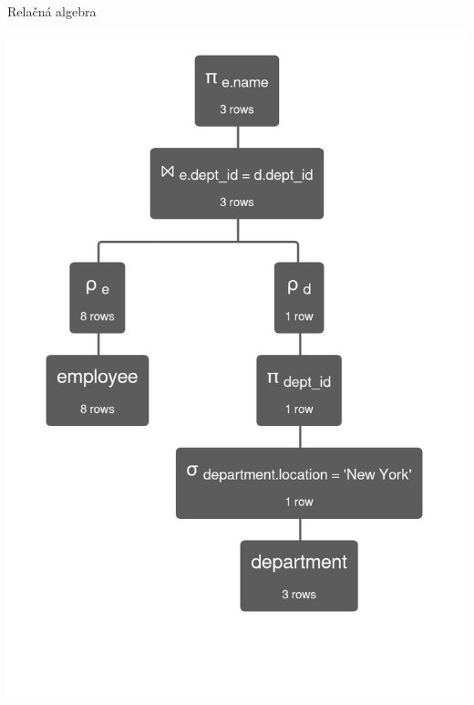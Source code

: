 \documentclass[12pt]{beamer}
\begin{document}
\begin{frame}[fragile]{Relačná algebra}
\begin{minipage}{.45\textwidth}
\includegraphics[scale=.18]{query4.jpg}
\end{minipage}
\end{frame}
\end{document}
